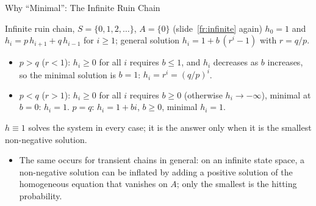 \begin{frame}{Why ``Minimal'': The Infinite Ruin Chain}
  \label{fr:minimal}
  \small
  \begin{exampleblock}{Infinite ruin chain, $S=\{0,1,2,\dots\}$, $A=\{0\}$ (slide~\ref{fr:infinite} again)}
    $h_0=1$ and $h_i=p\,h_{i+1}+q\,h_{i-1}$ for $i\ge1$; general solution $h_i=1+b\,(r^i-1)$ with $r=q/p$.
    \begin{itemize}
      \item $p>q$ ($r<1$): $h_i\ge0$ for all $i$ requires $b\le1$, and $h_i$ decreases as $b$ increases, so the minimal solution is $b=1$: $h_i=r^i=(q/p)^i$.
      \item $p<q$ ($r>1$): $h_i\ge0$ for all $i$ requires $b\ge0$ (otherwise $h_i\to-\infty$), minimal at $b=0$: $h_i=1$. \quad $p=q$: $h_i=1+bi$, $b\ge0$, minimal $h_i=1$.
    \end{itemize}
    $h\equiv1$ solves the system in every case; it is the answer only when it is the smallest non-negative solution.
  \end{exampleblock}
  \begin{itemize}
    \item The same occurs for transient chains in general: on an infinite state space, a non-negative solution can be inflated by adding a positive solution of the homogeneous equation that vanishes on $A$; only the smallest is the hitting probability.
  \end{itemize}
\end{frame}

